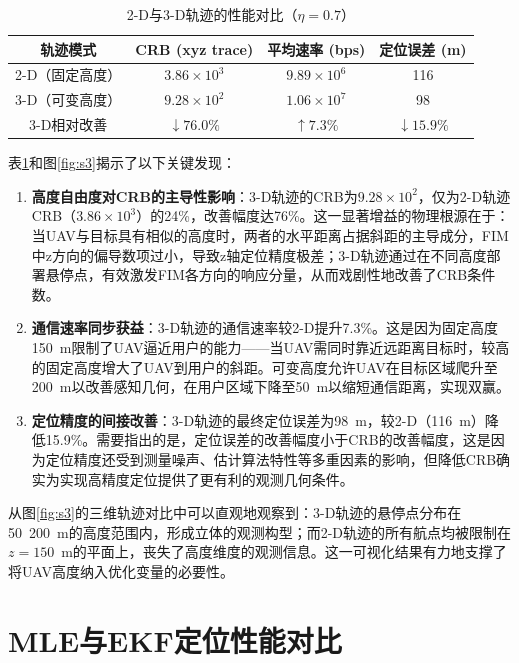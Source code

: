 \begin{table}[htbp]
\centering
\caption{2-D与3-D轨迹的性能对比（$\eta=0.7$）}
\label{tab:2d3d}
\begin{tabular}{cccc}
\toprule
轨迹模式 & CRB (xyz trace) & 平均速率 (bps) & 定位误差 (m) \\
\midrule
2-D（固定高度） & $3.86\times10^{3}$ & $9.89\times10^{6}$ & 116 \\
3-D（可变高度） & $9.28\times10^{2}$ & $1.06\times10^{7}$ & 98 \\
\hline
3-D相对改善   & $\downarrow76.0\%$ & $\uparrow7.3\%$ & $\downarrow15.9\%$ \\
\bottomrule
\end{tabular}
\end{table}

表\ref{tab:2d3d}和图\ref{fig:s3}揭示了以下关键发现：

\begin{enumerate}
\item \textbf{高度自由度对CRB的主导性影响}：3-D轨迹的CRB为$9.28\times10^{2}$，仅为2-D轨迹CRB（$3.86\times10^{3}$）的24\%，改善幅度达76\%。这一显著增益的物理根源在于：当UAV与目标具有相似的高度时，两者的水平距离占据斜距的主导成分，FIM中z方向的偏导数项过小，导致z轴定位精度极差；3-D轨迹通过在不同高度部署悬停点，有效激发FIM各方向的响应分量，从而戏剧性地改善了CRB条件数。

\item \textbf{通信速率同步获益}：3-D轨迹的通信速率较2-D提升7.3\%。这是因为固定高度150~m限制了UAV逼近用户的能力——当UAV需同时靠近远距离目标时，较高的固定高度增大了UAV到用户的斜距。可变高度允许UAV在目标区域爬升至200~m以改善感知几何，在用户区域下降至50~m以缩短通信距离，实现双赢。

\item \textbf{定位精度的间接改善}：3-D轨迹的最终定位误差为98~m，较2-D（116~m）降低15.9\%。需要指出的是，定位误差的改善幅度小于CRB的改善幅度，这是因为定位精度还受到测量噪声、估计算法特性等多重因素的影响，但降低CRB确实为实现高精度定位提供了更有利的观测几何条件。
\end{enumerate}

从图\ref{fig:s3}的三维轨迹对比中可以直观地观察到：3-D轨迹的悬停点分布在50~200~m的高度范围内，形成立体的观测构型；而2-D轨迹的所有航点均被限制在$z=150$~m的平面上，丧失了高度维度的观测信息。这一可视化结果有力地支撑了将UAV高度纳入优化变量的必要性。

\section{MLE与EKF定位性能对比}

